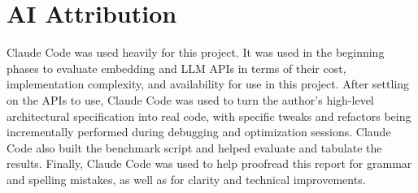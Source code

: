 \documentclass[conference]{IEEEtran}
\begin{document}
\section{AI Attribution}
Claude Code was used heavily for this project. It was used in the beginning phases to evaluate embedding and LLM APIs in terms of their cost, implementation complexity, and availability for use in this project. After settling on the APIs to use, Claude Code was used to turn the author's high-level architectural specification into real code, with specific tweaks and refactors being incrementally performed during debugging and optimization sessions. Claude Code also built the benchmark script and helped evaluate and tabulate the results. Finally, Claude Code was used to help proofread this report for grammar and spelling mistakes, as well as for clarity and technical improvements.



\end{document}
